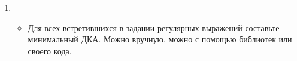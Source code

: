 \documentclass[12pt]{article}
\begin{document}
\begin{enumerate}
  \item 
  { \begin{itemize}
      \item Для всех встретившихся в задании регулярных выражений составьте минимальный ДКА. Можно вручную, можно с помощью библиотек или своего кода. 
    \end{itemize}
  }
\end{enumerate}

\end{document}
